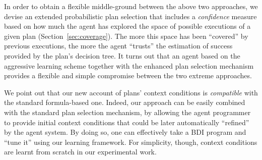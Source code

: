 In order to obtain a flexible middle-ground between the above two approaches, we
devise an extended probabilistic plan selection that includes a \emph{confidence}
measure based on how much the agent has explored the space of possible
executions of a given plan (Section~\ref{sec:coverage}). The more this space has
been ``covered'' by previous executions, the more the agent ``trusts'' the
estimation of success provided by the plan's decision tree.
It turns out that an agent based on the aggressive learning scheme together
with the enhanced plan selection mechanism provides a flexible and simple
compromise between the two extreme approaches.



We point out that our new account of plans' context conditions is
\emph{compatible} with the standard formula-based one.
Indeed, our approach can be easily combined with the standard plan selection
mechanism, by allowing the agent programmer to provide initial context conditions
that could be later automatically ``refined'' by the agent system. By doing so,
one can effectively take a BDI program and ``tune it'' using our learning
framework.
For simplicity, though, context conditions are learnt from scratch in our
experimental work.





%
